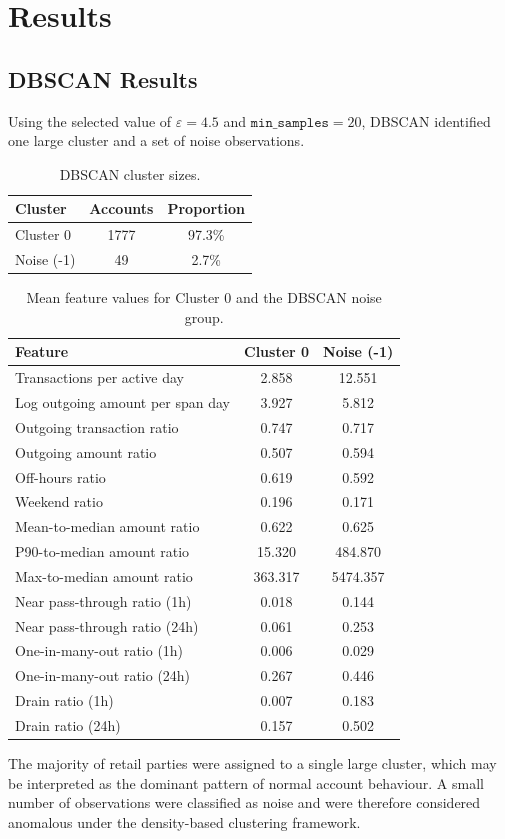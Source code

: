 \chapter{Results}
\section{DBSCAN Results}

Using the selected value of \(\varepsilon=4.5\) and
\(\texttt{min\_samples}=20\),
DBSCAN identified one large cluster and a set of noise observations.

\begin{table}[H]
\centering
\begin{tabular}{lcc}
\hline
Cluster & Accounts & Proportion \\
\hline
Cluster 0 & 1777 & 97.3\% \\
Noise (-1) & 49 & 2.7\% \\
\hline
\end{tabular}
\caption{DBSCAN cluster sizes.}
\end{table}
\begin{table}[H]
\centering
\small
\begin{tabular}{lcc}
\hline
Feature & Cluster 0 & Noise (-1) \\
\hline
Transactions per active day & 2.858 & 12.551 \\
Log outgoing amount per span day & 3.927 & 5.812 \\
Outgoing transaction ratio & 0.747 & 0.717 \\
Outgoing amount ratio & 0.507 & 0.594 \\
Off-hours ratio & 0.619 & 0.592 \\
Weekend ratio & 0.196 & 0.171 \\
Mean-to-median amount ratio & 0.622 & 0.625 \\
P90-to-median amount ratio & 15.320 & 484.870 \\
Max-to-median amount ratio & 363.317 & 5474.357 \\
Near pass-through ratio (1h) & 0.018 & 0.144 \\
Near pass-through ratio (24h) & 0.061 & 0.253 \\
One-in-many-out ratio (1h) & 0.006 & 0.029 \\
One-in-many-out ratio (24h) & 0.267 & 0.446 \\
Drain ratio (1h) & 0.007 & 0.183 \\
Drain ratio (24h) & 0.157 & 0.502 \\
\hline
\end{tabular}
\caption{Mean feature values for Cluster 0 and the DBSCAN noise group.}
\label{tab:dbscan_profile}
\end{table}
The majority of retail parties were assigned to a single large cluster,
which may be interpreted as the dominant pattern of normal account
behaviour. A small number of observations were classified as noise and
were therefore considered anomalous under the density-based clustering
framework.

